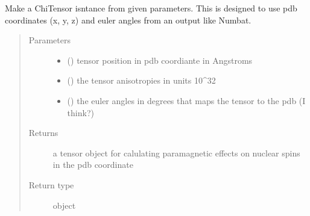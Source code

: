 \documentclass[a4paper,10pt,english,openany,oneside]{sphinxmanual}
\begin{document}
\begin{fulllineitems}
\label{\detokenize{reference/generated/paramagpy.metal.make_tensor:paramagpy.metal.make_tensor}}
\sphinxAtStartPar
Make a ChiTensor isntance from given parameters.
This is designed to use pdb coordinates (x, y, z) and euler angles
from an output like Numbat.
\begin{quote}\begin{description}
\item[{Parameters}] \leavevmode\begin{itemize}
\item {} 
\sphinxAtStartPar
{} (\sphinxstyleliteralemphasis{\sphinxupquote{, }}\sphinxstyleliteralemphasis{\sphinxupquote{,}}) \textendash{} tensor position in pdb coordiante in Angstroms

\item {} 
\sphinxAtStartPar
{} (\sphinxstyleliteralemphasis{\sphinxupquote{,}}) \textendash{} the tensor anisotropies in units 10\textasciicircum{}\sphinxhyphen{}32

\item {} 
\sphinxAtStartPar
{} (\sphinxstyleliteralemphasis{\sphinxupquote{, }}\sphinxstyleliteralemphasis{\sphinxupquote{,}}) \textendash{} the euler angles in degrees that maps the tensor
to the pdb (I think?)

\end{itemize}

\item[{Returns}] \leavevmode
\sphinxAtStartPar
{} \textendash{} a tensor object for calulating paramagnetic effects on
nuclear spins in the pdb coordinate

\item[{Return type}] \leavevmode
\sphinxAtStartPar
object {\hyperref[\detokenize{reference/generated/paramagpy.metal.Metal:paramagpy.metal.Metal}]{}}

\end{description}\end{quote}

\end{fulllineitems}
\end{document}
